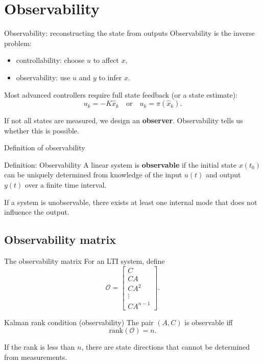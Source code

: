 \documentclass[aspectratio=169,10pt]{beamer}
\newcommand{\Ocal}{\mathcal{O}}
\begin{document}
\section{Observability}

\begin{frame}{Observability: reconstructing the state from outputs}
Observability is the inverse problem:
\begin{itemize}
  \item controllability: choose \(u\) to affect \(x\),
  \item observability: use \(u\) and \(y\) to infer \(x\).
\end{itemize}

Most advanced controllers require full state feedback (or a state estimate):
\[
u_k = -K\hat{x}_k
\quad \text{or} \quad
u_k = \pi(\hat{x}_k).
\]

If not all states are measured, we design an \textbf{observer}.
Observability tells us whether this is possible.
\end{frame}

\begin{frame}{Definition of observability}
\begin{defnbox}{Definition: Observability}
A linear system is \textbf{observable} if the initial state \(x(t_0)\) can be uniquely determined
from knowledge of the input \(u(t)\) and output \(y(t)\) over a finite time interval.
\end{defnbox}

If a system is unobservable, there exists at least one internal mode that does not influence the output.
\end{frame}

\subsection{Observability matrix}

\begin{frame}{The observability matrix}
For an LTI system, define
\[
\Ocal=
\begin{bmatrix}
C\\
CA\\
CA^2\\
\vdots\\
CA^{n-1}
\end{bmatrix}.
\]

\begin{notebox}{Kalman rank condition (observability)}
The pair \((A,C)\) is observable iff
\[
\mathrm{rank}(\Ocal)=n.
\]
\end{notebox}

If the rank is less than \(n\), there are state directions that cannot be determined from measurements.
\end{frame}
\end{document}
